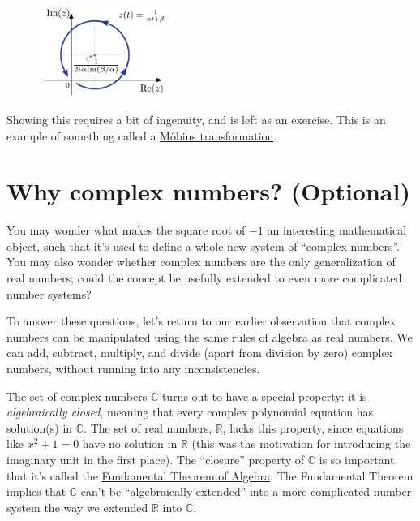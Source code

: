 \documentclass[10pt,a4paper]{article}
\begin{document}
\begin{figure}[h]
  \centering\includegraphics[width=0.37\textwidth]{complex_trajectory_3}
\end{figure}

\noindent
Showing this requires a bit of ingenuity, and is left as an
exercise. This is an example of something called a
\href{http://en.wikipedia.org/wiki/M\%C3\%B6bius_transformation}{M\"obius
  transformation}.

\section{Why complex numbers? (Optional)}\label{why-complex-numbers-optional}

You may wonder what makes the square root of $-1$ an interesting
mathematical object, such that it's used to define a whole new system
of ``complex numbers''. You may also wonder whether complex numbers
are the only generalization of real numbers; could the concept be
usefully extended to even more complicated number systems?

To answer these questions, let's return to our earlier observation that
complex numbers can be manipulated using the same rules of algebra as
real numbers. We can add, subtract, multiply, and divide (apart from
division by zero) complex numbers, without running into any
inconsistencies.

The set of complex numbers $\mathbb{C}$ turns out to have a special
property: it is \emph{algebraically closed}, meaning that every
complex polynomial equation has solution(s) in $\mathbb{C}$. The set
of real numbers, $\mathbb{R}$, lacks this property, since equations
like $x^2 + 1 = 0$ have no solution in $\mathbb{R}$ (this was the
motivation for introducing the imaginary unit in the first place). The
``closure'' property of $\mathbb{C}$ is so important that it's called
the
\href{https://en.wikipedia.org/wiki/Fundamental_theorem_of_algebra}{Fundamental
  Theorem of Algebra}. The Fundamental Theorem implies that
$\mathbb{C}$ can't be ``algebraically extended'' into a more
complicated number system the way we extended $\mathbb{R}$ into
$\mathbb{C}$.
\end{document}
